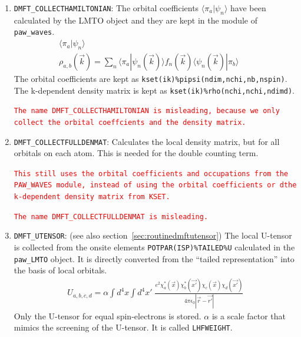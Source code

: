 \documentclass[11pt,a4paper]{report}
\newcommand{\petertt}[1]{\textcolor{red}{\texttt{#1}}}
\begin{document}
\begin{enumerate}
\item \verb|DMFT_COLLECTHAMILTONIAN|: The orbital coefficients
  $\langle\pi_a|\psi_n\rangle$ have been calculated by the LMTO object
  and they are kept in the module of \verb|paw_waves|.
\begin{eqnarray}
\langle\pi_a|\psi_n\rangle&&
\\
\rho_{a,b}(\vec{k})=\sum_n
\langle\pi_a|\psi_n(\vec{k})\rangle f_n(\vec{k})
\langle\psi_n(\vec{k})|\pi_b\rangle
\end{eqnarray}
The orbital coefficients are kept as
\verb|kset(ik)%pipsi(ndim,nchi,nb,nspin)|. The k-dependent density
matrix is kept as \verb|kset(ik)%rho(nchi,nchi,ndimd)|.

\petertt{The name DMFT\_COLLECTHAMILTONIAN is misleading,
  because we only collect the orbital coeffcients and the density
  matrix.}
%
\item \verb|DMFT_COLLECTFULLDENMAT|: Calculates the local density matrix,
  but for all orbitals on each atom. This is needed for the double
  counting term.

 \petertt{This still uses the orbital coefficients and occupations
   from the PAW\_WAVES module, instead of using the orbital
   coefficients or dthe k-dependent density matrix from KSET.}

 \petertt{The name DMFT\_COLLECTFULLDENMAT is misleading.}
%
\item \verb|DMFT_UTENSOR|: (see also
  section~\ref{sec:routinedmftutensor}) The local U-tensor is
  collected from the onsite elements \verb|POTPAR(ISP)%TAILED%U|
  calculated in the \verb|paw_LMTO| object. It is directly converted
  from the ``tailed representation'' into the basis of local orbitals.
\begin{eqnarray}
U_{a,b,c,d}=\alpha\int d^4x\int d^4x'\;
\frac{e^2\chi^*_a(\vec{x})\chi^*_b(\vec{x'})\chi_c(\vec{x})\chi_d(\vec{x'})}
{4\pi\epsilon_0|\vec{r}-\vec{r'}|}
\label{eq:defutensordmftobject}
\end{eqnarray}
Only the U-tensor for equal spin-electrons is stored. $\alpha$ is a
scale factor that mimics the screening of the U-tensor. It is called
\verb|LHFWEIGHT|.


\end{enumerate}
\end{document}
